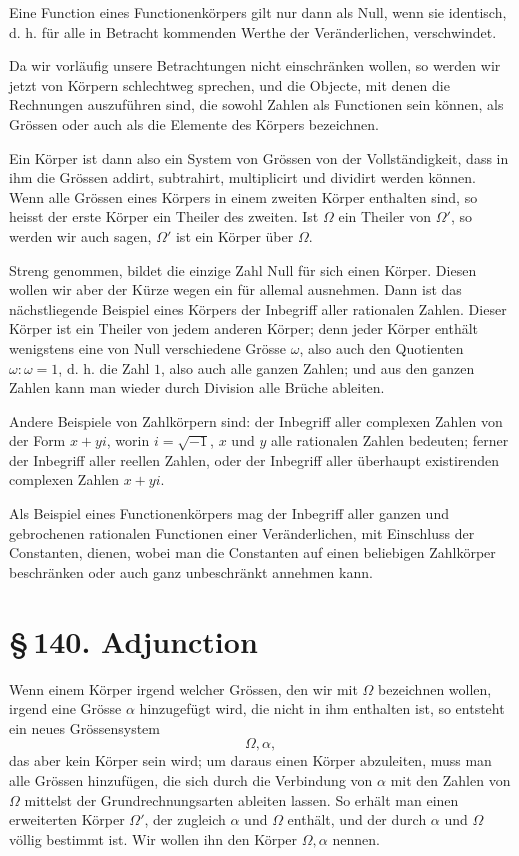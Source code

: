 \documentclass[11pt]{article}
\providecommand{\sect}[2]{\section*{\S\,#1. #2}}
\begin{document}
Eine Function eines Functionenkörpers gilt nur dann als Null, wenn sie identisch, d. h. für alle in Betracht kommenden Werthe der Veränderlichen, verschwindet.

Da wir vorläufig unsere Betrachtungen nicht einschränken wollen, so werden wir jetzt von Körpern schlechtweg sprechen, und die Objecte, mit denen die Rechnungen auszuführen sind, die sowohl Zahlen als Functionen sein können, als Grössen oder auch als die Elemente des Körpers bezeichnen.

Ein Körper ist dann also ein System von Grössen von der Vollständigkeit, dass in ihm die Grössen addirt, subtrahirt, multiplicirt und dividirt werden können. Wenn alle Grössen eines Körpers in einem zweiten Körper enthalten sind, so heisst der erste Körper ein Theiler des zweiten. Ist $\Omega$ ein Theiler von $\Omega'$, so werden wir auch sagen, $\Omega'$ ist ein Körper über $\Omega$.

Streng genommen, bildet die einzige Zahl Null für sich einen Körper. Diesen wollen wir aber der Kürze wegen ein für allemal ausnehmen. Dann ist das nächstliegende Beispiel eines Körpers der Inbegriff aller rationalen Zahlen. Dieser Körper ist ein Theiler von jedem anderen Körper; denn jeder Körper enthält wenigstens eine von Null verschiedene Grösse $\omega$, also auch den Quotienten $\omega:\omega=1$, d. h. die Zahl $1$, also auch alle ganzen Zahlen; und aus den ganzen Zahlen kann man wieder durch Division alle Brüche ableiten.

Andere Beispiele von Zahlkörpern sind: der Inbegriff aller complexen Zahlen von der Form $x+yi$, worin $i=\sqrt{-1}$, $x$ und $y$ alle rationalen Zahlen bedeuten; ferner der Inbegriff aller reellen Zahlen, oder der Inbegriff aller überhaupt existirenden complexen Zahlen $x+yi$.

Als Beispiel eines Functionenkörpers mag der Inbegriff aller ganzen und gebrochenen rationalen Functionen einer Veränderlichen, mit Einschluss der Constanten, dienen, wobei man die Constanten auf einen beliebigen Zahlkörper beschränken oder auch ganz unbeschränkt annehmen kann.

\sect{140}{Adjunction}

Wenn einem Körper irgend welcher Grössen, den wir mit $\Omega$ bezeichnen wollen, irgend eine Grösse $\alpha$ hinzugefügt wird, die nicht in ihm enthalten ist, so entsteht ein neues Grössensystem
\[
        \Omega,\alpha,
\]
das aber kein Körper sein wird; um daraus einen Körper abzuleiten, muss man alle Grössen hinzufügen, die sich durch die Verbindung von $\alpha$ mit den Zahlen von $\Omega$ mittelst der Grundrechnungsarten ableiten lassen. So erhält man einen erweiterten Körper $\Omega'$, der zugleich $\alpha$ und $\Omega$ enthält, und der durch $\alpha$ und $\Omega$ völlig bestimmt ist. Wir wollen ihn den Körper $\Omega,\alpha$ nennen.
\end{document}
